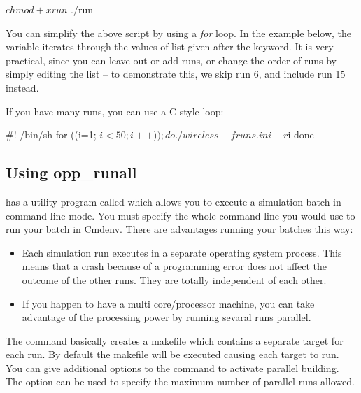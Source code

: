 \begin{commandline}
$ chmod +x run
$ ./run
\end{commandline}

You can simplify the above script by using a \textit{for} loop.
In the example below, the variable  iterates through
the values of list given after the  keyword.
It is very practical, since you can leave out or add runs,
or change the order of runs by simply editing the list --
to demonstrate this, we skip run 6, and include run 15 instead.


If you have many runs, you can use a C-style loop:

\begin{filelisting}
#! /bin/sh
for ((i=1; $i<50; i++)); do
   ./wireless -f runs.ini -r $i
done
\end{filelisting}

\subsection{Using opp\_runall}

{\opp} has a utility program called  which
allows you to execute a simulation batch in command line mode.
You must specify the whole command line you would use to run
your batch in Cmdenv. There are advantages running your batches
this way:
\begin{itemize}
  \item Each simulation run executes in a separate operating system process.
        This means that a crash because of a programming error does not affect
        the outcome of the other runs. They are totally independent of each other.
  \item If you happen to have a multi core/processor machine, you can take advantage
        of the processing power by running sevaral runs parallel.
\end{itemize}

The command basically creates a makefile which contains
a separate target for each run. By default the makefile will be executed causing each
target to run. You can give additional options to the  command to
activate parallel building. The  option can be used to specify the maximum number
of parallel runs allowed.

